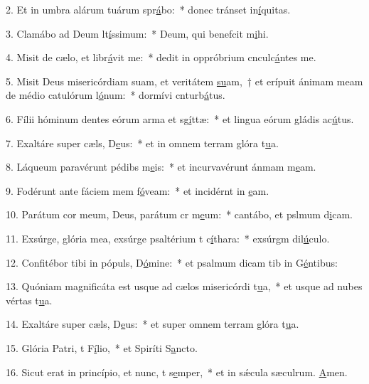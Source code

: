 2. Et in umbra alárum tuárum spr\uline{á}bo:~* donec tránset in\uline{í}quitas.\par 
3. Clamábo ad Deum lt\uline{í}ssimum:~* Deum, qui benefcit m\uline{i}hi.\par 
4. Misit de cælo, et libr\uline{á}vit me:~* dedit in oppróbrium cnculc\uline{á}ntes me.\par 
5. Misit Deus misericórdiam suam, et veritátem \uline{su}am,~† et erípuit ánimam meam de médio catulórum l\uline{ó}num:~* dormívi cnturb\uline{á}tus.\par 
6. Fílii hóminum dentes eórum arma et sg\uline{í}ttæ:~* et lingua eórum gládis ac\uline{ú}tus.\par 
7. Exaltáre super cæls, D\uline{e}us:~* et in omnem terram glóra t\uline{u}a.\par 
8. Láqueum paravérunt pédibs m\uline{e}is:~* et incurvavérunt ánmam m\uline{e}am.\par 
9. Fodérunt ante fáciem mem f\uline{ó}veam:~* et incidérnt in \uline{e}am.\par 
10. Parátum cor meum, Deus, parátum cr m\uline{e}um:~* cantábo, et pslmum d\uline{i}cam.\par 
11. Exsúrge, glória mea, exsúrge psaltérium t c\uline{í}thara:~* exsúrgm dil\uline{ú}culo.\par 
12. Confitébor tibi in pópuls, D\uline{ó}mine:~* et psalmum dicam tib in G\uline{é}ntibus:\par 
13. Quóniam magnificáta est usque ad cælos misericórdi t\uline{u}a,~* et usque ad nubes vértas t\uline{u}a.\par 
14. Exaltáre super cæls, D\uline{e}us:~* et super omnem terram glóra t\uline{u}a.\par 
15. Glória Patri, t F\uline{í}lio,~* et Spiríti S\uline{a}ncto.\par 
16. Sicut erat in princípio, et nunc, t s\uline{e}mper,~* et in sǽcula sæculrum. \uline{A}men.\par 
